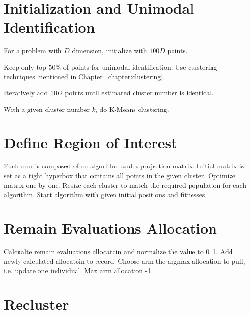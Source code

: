 \section{Initialization and Unimodal Identification}

For a problem with $D$ dimension, initialize with $100D$ points.

Keep only top $50\%$ of points for unimodal identification. 
Use clustering techniques mentioned in Chapter~\ref{chapter:clustering}.

Iteratively add $10D$ points until estimated cluster number is identical.

With a given cluster number $k$, do K-Means clustering.





\section{Define Region of Interest}

Each arm is composed of an algorithm and a projection matrix.
Initial matrix is set as a tight hyperbox that contains all points in the given cluster.
Optimize matrix one-by-one.
Resize each cluster to match the required population for each algorithm.
Start algorithm with given initial positions and fitnesses.





\section{Remain Evaluations Allocation}

Calcualte remain evaluations allocatoin and normalize the value to 0~1.
Add newly calculated allocatoin to record.
Choose arm the argmax allocation to pull, i.e. update one individual.
Max arm allocation -1.





\section{Recluster}


